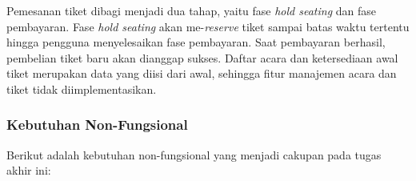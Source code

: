 Pemesanan tiket dibagi menjadi dua tahap, yaitu fase \textit{hold seating} dan fase pembayaran. Fase \textit{hold seating} akan me-\textit{reserve} tiket sampai batas waktu tertentu hingga pengguna menyelesaikan fase pembayaran. Saat pembayaran berhasil, pembelian tiket baru akan dianggap sukses. Daftar acara dan ketersediaan awal tiket merupakan data yang diisi dari awal, sehingga fitur manajemen acara dan tiket tidak diimplementasikan.

\subsubsection{Kebutuhan Non-Fungsional}

Berikut adalah kebutuhan non-fungsional yang menjadi cakupan pada tugas akhir ini:

\begingroup
\footnotesize
